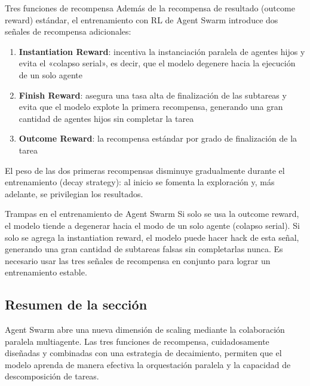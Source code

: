 \begin{importantbox}{Tres funciones de recompensa}
Además de la recompensa de resultado (outcome reward) estándar, el entrenamiento con RL de Agent Swarm introduce dos señales de recompensa adicionales:
\begin{enumerate}
    \item \textbf{Instantiation Reward}: incentiva la instanciación paralela de agentes hijos y evita el «colapso serial», es decir, que el modelo degenere hacia la ejecución de un solo agente
    \item \textbf{Finish Reward}: asegura una tasa alta de finalización de las subtareas y evita que el modelo explote la primera recompensa, generando una gran cantidad de agentes hijos sin completar la tarea
    \item \textbf{Outcome Reward}: la recompensa estándar por grado de finalización de la tarea
\end{enumerate}
El peso de las dos primeras recompensas disminuye gradualmente durante el entrenamiento (decay strategy): al inicio se fomenta la exploración y, más adelante, se privilegian los resultados.
\end{importantbox}

\begin{warningbox}{Trampas en el entrenamiento de Agent Swarm}
Si solo se usa la outcome reward, el modelo tiende a degenerar hacia el modo de un solo agente (colapso serial). Si solo se agrega la instantiation reward, el modelo puede hacer hack de esta señal, generando una gran cantidad de subtareas falsas sin completarlas nunca. Es necesario usar las tres señales de recompensa en conjunto para lograr un entrenamiento estable.
\end{warningbox}

\subsection{Resumen de la sección}

Agent Swarm abre una nueva dimensión de scaling mediante la colaboración paralela multiagente. Las tres funciones de recompensa, cuidadosamente diseñadas y combinadas con una estrategia de decaimiento, permiten que el modelo aprenda de manera efectiva la orquestación paralela y la capacidad de descomposición de tareas.
